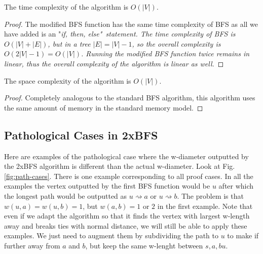 \begin{lem} The time complexity of the algorithm is $O(|V|)$. \end{lem}

\begin{proof}
    The modified BFS function has the same time complexity of BFS as all we have added is an "\em if, then, else\em"~statement. The time complexity of BFS is $O(|V| + |E|)$, but in a tree $|E| = |V| - 1$, so the overall complexity is $O(2|V| - 1) = O(|V|)$. 
    Running the modified BFS function twice remains in linear, thus the overall complexity of the algorithm is linear as well.
\end{proof}

\begin{lem} The space complexity of the algorithm is $O(|V|)$. \end{lem}

\begin{proof}
    Completely analogous to the standard BFS algorithm, this algorithm uses the same amount of memory in the standard memory model.
\end{proof}

\subsection{Pathological Cases in 2xBFS}

Here are examples of the pathological case where the w-diameter outputted by the 2xBFS algorithm is different than the actual w-diameter. Look at Fig. \ref{fig:path-cases}. There is one example corresponding to all proof cases. In all the examples the vertex outputted by the first BFS function would be $u$ after which the longest path would be outputted as $u \rightsquigarrow a$ or $u \rightsquigarrow b$. The problem is that $w(u, a) = w(u, b) = 1$, but $w(a, b) = 1$ or $2$ in the first example. Note that even if we adapt the algorithm so that it finds the vertex with largest w-length away and breaks ties with normal distance, we will still be able to apply these examples. We just need to augment them by subdividing the path to $u$ to make if further away from $a$ and $b$, but keep the same w-lenght between $s, a, b u$.

